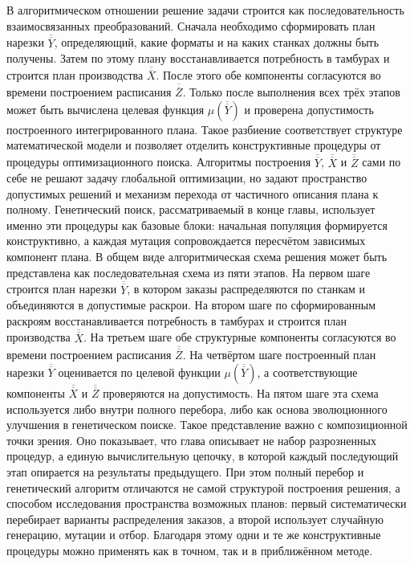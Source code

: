 В алгоритмическом отношении решение задачи строится как последовательность взаимосвязанных преобразований. Сначала необходимо сформировать план нарезки $\overline{\overline{Y}}$, определяющий, какие форматы и на каких станках должны быть получены. Затем по этому плану восстанавливается потребность в тамбурах и строится план производства $\overline{\overline{X}}$. После этого обе компоненты согласуются во времени построением расписания $\overline{\overline{Z}}$. Только после выполнения всех трёх этапов может быть вычислена целевая функция $\mu(\overline{\overline{Y}})$ и проверена допустимость построенного интегрированного плана.
Такое разбиение соответствует структуре математической модели и позволяет отделить конструктивные процедуры от процедуры оптимизационного поиска. Алгоритмы построения $\overline{\overline{Y}}$, $\overline{\overline{X}}$ и $\overline{\overline{Z}}$ сами по себе не решают задачу глобальной оптимизации, но задают пространство допустимых решений и механизм перехода от частичного описания плана к полному. Генетический поиск, рассматриваемый в конце главы, использует именно эти процедуры как базовые блоки: начальная популяция формируется конструктивно, а каждая мутация сопровождается пересчётом зависимых компонент плана.
В общем виде алгоритмическая схема решения может быть представлена как последовательная схема из пяти этапов. На первом шаге строится план нарезки $\overline{\overline{Y}}$, в котором заказы распределяются по станкам и объединяются в допустимые раскрои. На втором шаге по сформированным раскроям восстанавливается потребность в тамбурах и строится план производства $\overline{\overline{X}}$. На третьем шаге обе структурные компоненты согласуются во времени построением расписания $\overline{\overline{Z}}$. На четвёртом шаге построенный план нарезки $\overline{\overline{Y}}$ оценивается по целевой функции $\mu(\overline{\overline{Y}})$, а соответствующие компоненты $\overline{\overline{X}}$ и $\overline{\overline{Z}}$ проверяются на допустимость. На пятом шаге эта схема используется либо внутри полного перебора, либо как основа эволюционного улучшения в генетическом поиске.
Такое представление важно с композиционной точки зрения. Оно показывает, что глава описывает не набор разрозненных процедур, а единую вычислительную цепочку, в которой каждый последующий этап опирается на результаты предыдущего. При этом полный перебор и генетический алгоритм отличаются не самой структурой построения решения, а способом исследования пространства возможных планов: первый систематически перебирает варианты распределения заказов, а второй использует случайную генерацию, мутации и отбор. Благодаря этому одни и те же конструктивные процедуры можно применять как в точном, так и в приближённом методе.

